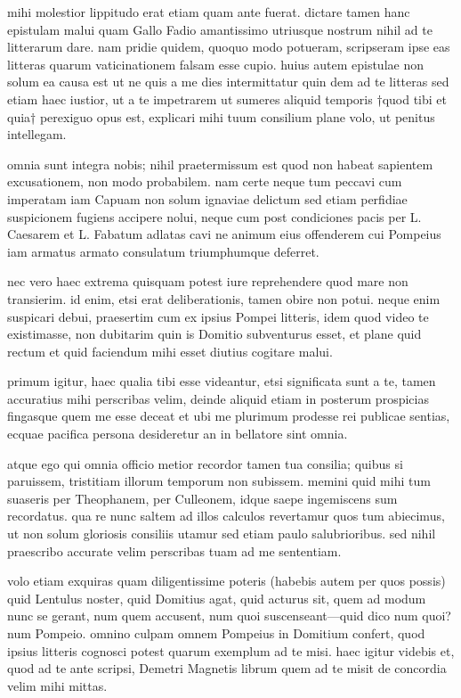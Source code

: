 


 mihi molestior lippitudo erat etiam quam ante fuerat. dictare tamen hanc epistulam malui quam Gallo Fadio amantissimo utriusque nostrum nihil ad te litterarum dare. nam pridie quidem, quoquo modo potueram, scripseram ipse eas litteras quarum vaticinationem falsam esse cupio. huius autem epistulae non solum ea causa est ut ne quis a me dies intermittatur quin dem ad te litteras sed etiam haec iustior, ut a te impetrarem ut sumeres aliquid temporis †quod tibi et quia† perexiguo opus est, explicari mihi tuum consilium plane volo, ut penitus intellegam.

 omnia sunt integra nobis; nihil praetermissum est quod non habeat sapientem excusationem, non modo probabilem. nam certe neque tum peccavi cum imperatam iam Capuam non solum ignaviae delictum sed etiam perfidiae suspicionem fugiens accipere nolui, neque cum post condiciones pacis per L. Caesarem et L. Fabatum adlatas cavi ne animum eius offenderem cui Pompeius iam armatus armato consulatum triumphumque deferret.

 nec vero haec extrema quisquam potest iure reprehendere quod mare non transierim. id enim, etsi erat deliberationis, tamen obire non potui. neque enim suspicari debui, praesertim cum ex ipsius Pompei litteris, idem quod video te existimasse, non dubitarim quin is Domitio subventurus esset, et plane quid rectum et quid faciendum mihi esset diutius cogitare malui.

 primum igitur, haec qualia tibi esse videantur, etsi significata sunt a te, tamen accuratius mihi perscribas velim, deinde aliquid etiam in posterum prospicias fingasque quem me esse deceat et ubi me plurimum prodesse rei publicae sentias, ecquae pacifica persona desideretur an in bellatore sint omnia.

 atque ego qui omnia officio metior recordor tamen tua consilia; quibus si paruissem, tristitiam illorum temporum non subissem. memini quid mihi tum suaseris per Theophanem, per Culleonem, idque saepe ingemiscens sum recordatus. qua re nunc saltem ad illos calculos revertamur quos tum abiecimus, ut non solum gloriosis consiliis utamur sed etiam paulo salubrioribus. sed nihil praescribo accurate velim perscribas tuam ad me sententiam.

 volo etiam exquiras quam diligentissime poteris (habebis autem per quos possis) quid Lentulus noster, quid Domitius agat, quid acturus sit, quem ad modum nunc se gerant, num quem accusent, num quoi suscenseant—quid dico num quoi? num Pompeio. omnino culpam omnem Pompeius in Domitium confert, quod ipsius litteris cognosci potest quarum exemplum ad te misi. haec igitur videbis et, quod ad te ante scripsi, Demetri Magnetis librum quem ad te misit de concordia velim mihi mittas.
